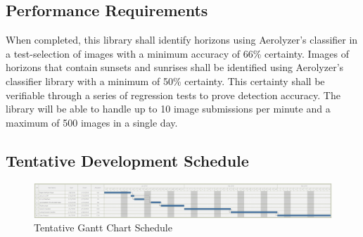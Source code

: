 \documentclass[journal,10pt,draftclsnofoot,onecolumn]{IEEEtran}
\begin{document}
\begin{singlespace}
	\subsection{Performance Requirements}
		When completed, this library shall identify horizons using Aerolyzer's classifier in a test-selection of images with a minimum accuracy of 66\% certainty.
		Images of horizons that contain sunsets and sunrises shall be identified using Aerolyzer's classifier library with a minimum of 50\% certainty.
		This certainty shall be verifiable through a series of regression tests to prove detection accuracy.
		The library will be able to handle up to 10 image submissions per minute and a maximum of 500 images in a single day.

	\begin{landscape}
		\section{Tentative Development Schedule}
		\begin{figure}[h]
			\includegraphics[width=9.5in]{gantt.png}
			\caption{Tentative Gantt Chart Schedule}
		    \label{fig:Tentative Schedule}
	    \end{figure}
	\end{landscape}

\end{singlespace}
\end{document}
